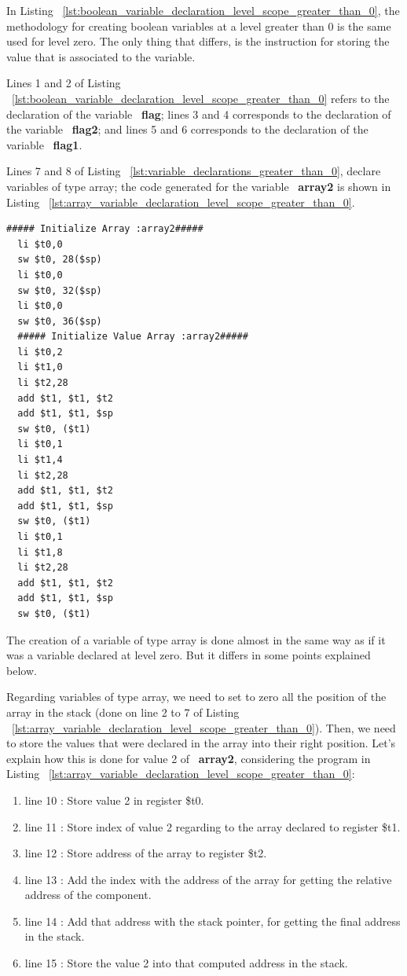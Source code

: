 \documentclass[
  oneside,
  11pt, a4paper,
  footinclude=true,
  headinclude=true,
  cleardoublepage=empty
]{scrbook}
\begin{document}
In Listing ~\ref{lst:boolean_variable_declaration_level_scope_greater_than_0}, the methodology for creating boolean variables at a level greater than 0 is the same used for level zero. The only thing that differs, is the instruction for storing the value that is associated to the variable.

Lines 1 and 2 of Listing ~\ref{lst:boolean_variable_declaration_level_scope_greater_than_0} refers to the declaration of the variable ~\textbf{flag}; lines 3 and 4 corresponds to the declaration of the variable ~\textbf{flag2}; and lines 5 and 6 corresponds to the declaration of the variable ~\textbf{flag1}.

Lines 7 and 8 of Listing ~\ref{lst:variable_declarations_greater_than_0}, declare variables of type array; the code generated for the variable ~\textbf{array2} is shown in Listing ~\ref{lst:array_variable_declaration_level_scope_greater_than_0}.

\begin{lstlisting}[caption={Declaring array variables in a level greater than 0},label={lst:array_variable_declaration_level_scope_greater_than_0}]
  ##### Initialize Array :array2#####
  li $t0,0		
  sw $t0, 28($sp)
  li $t0,0		
  sw $t0, 32($sp)
  li $t0,0		
  sw $t0, 36($sp)
  ##### Initialize Value Array :array2#####
  li $t0,2		
  li $t1,0		
  li $t2,28		
  add $t1, $t1, $t2	
  add $t1, $t1, $sp
  sw $t0, ($t1)
  li $t0,1		
  li $t1,4		
  li $t2,28		
  add $t1, $t1, $t2	
  add $t1, $t1, $sp
  sw $t0, ($t1)
  li $t0,1		
  li $t1,8		
  li $t2,28		
  add $t1, $t1, $t2	
  add $t1, $t1, $sp
  sw $t0, ($t1)
\end{lstlisting}

The creation of a variable of type array is done almost in the same way as if it was a variable declared at level zero.
But it differs in some points explained below.

Regarding variables of type array, we need to set to zero all the position of the array in the stack (done on line 2 to 7 of Listing ~\ref{lst:array_variable_declaration_level_scope_greater_than_0}). Then, we need to store the values that were declared in the array into their right position.
Let's explain how this is done for value 2 of ~\textbf{array2}, considering the program in Listing ~\ref{lst:array_variable_declaration_level_scope_greater_than_0}:

\begin{enumerate}
\item line 10 : Store value 2 in register \$t0.
\item line 11 : Store index of value 2 regarding to the array declared to register \$t1.
\item line 12 : Store address of the array to register \$t2.
\item line 13 : Add the index with the address of the array for getting the relative address of the component.
\item line 14 : Add that address with the stack pointer, for getting the final address in the stack.
\item line 15 : Store the value 2 into that computed address in the stack.
\end{enumerate}
\end{document}

